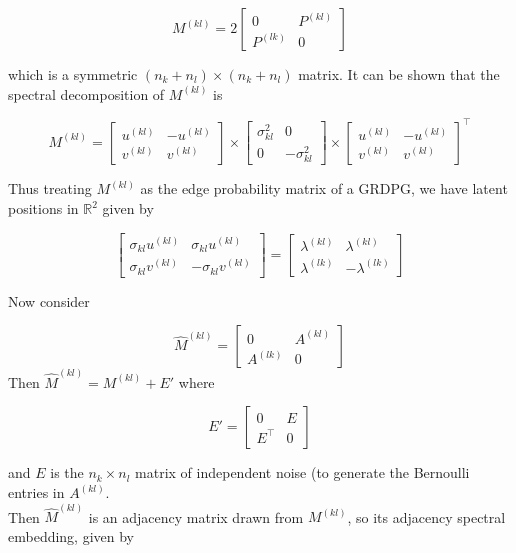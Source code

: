 \documentclass[12pt]{article}
\begin{document}
\[M^{(kl)} = 2 \begin{bmatrix} 0 & P^{(kl)} \\ P^{(lk)} & 0 \end{bmatrix}\]

which is a symmetric \((n_k + n_l) \times (n_k + n_l)\) matrix. It can
be shown that the spectral decomposition of \(M^{(kl)}\) is

\[M^{(kl)} = 
\begin{bmatrix} u^{(kl)} & -u^{(kl)} \\ v^{(kl)} & v^{(kl)} \end{bmatrix} \times 
\begin{bmatrix} \sigma^2_{kl} & 0 \\ 0 & -\sigma^2_{kl} \end{bmatrix} \times
\begin{bmatrix} u^{(kl)} & -u^{(kl)} \\ v^{(kl)} & v^{(kl)} \end{bmatrix}^\top\]

Thus treating \(M^{(kl)}\) as the edge probability matrix of a GRDPG, we
have latent positions in \(\mathbb{R}^2\) given by

\[\begin{bmatrix} 
  \sigma_{kl} u^{(kl)} & \sigma_{kl} u^{(kl)} \\ 
  \sigma_{kl} v^{(kl)} & -\sigma_{kl} v^{(kl)} 
\end{bmatrix} = 
\begin{bmatrix} 
  \lambda^{(kl)} & \lambda^{(kl)} \\ 
  \lambda^{(lk)} & -\lambda^{(lk)} 
\end{bmatrix}\]

Now consider

\[\hat{M}^{(kl)} = \begin{bmatrix} 0 & A^{(kl)} \\ A^{(lk)} & 0 \end{bmatrix}\]
Then \(\hat{M}^{(kl)} = M^{(kl)} + E'\) where

\[E' = \begin{bmatrix} 0 & E \\ E^\top & 0 \end{bmatrix}\]

and \(E\) is the \(n_k \times n_l\) matrix of independent noise (to
generate the Bernoulli entries in \(A^{(kl)}\).\\
Then \(\hat{M}^{(kl)}\) is an adjacency matrix drawn from \(M^{(kl)}\),
so its adjacency spectral embedding, given by
\end{document}
